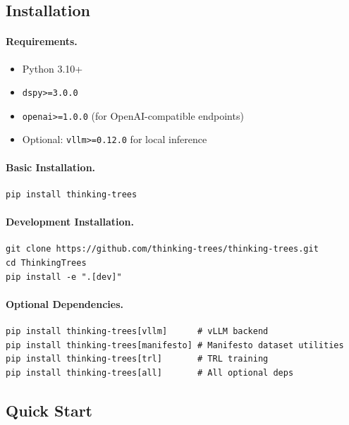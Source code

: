 \subsection{Installation}

\paragraph{Requirements.}
\begin{itemize}[nosep]
    \item Python 3.10+
    \item \texttt{dspy>=3.0.0}
    \item \texttt{openai>=1.0.0} (for OpenAI-compatible endpoints)
    \item Optional: \texttt{vllm>=0.12.0} for local inference
\end{itemize}

\paragraph{Basic Installation.}
\begin{lstlisting}
pip install thinking-trees
\end{lstlisting}

\paragraph{Development Installation.}
\begin{lstlisting}
git clone https://github.com/thinking-trees/thinking-trees.git
cd ThinkingTrees
pip install -e ".[dev]"
\end{lstlisting}

\paragraph{Optional Dependencies.}
\begin{lstlisting}
pip install thinking-trees[vllm]      # vLLM backend
pip install thinking-trees[manifesto] # Manifesto dataset utilities
pip install thinking-trees[trl]       # TRL training
pip install thinking-trees[all]       # All optional deps
\end{lstlisting}

\subsection{Quick Start}

